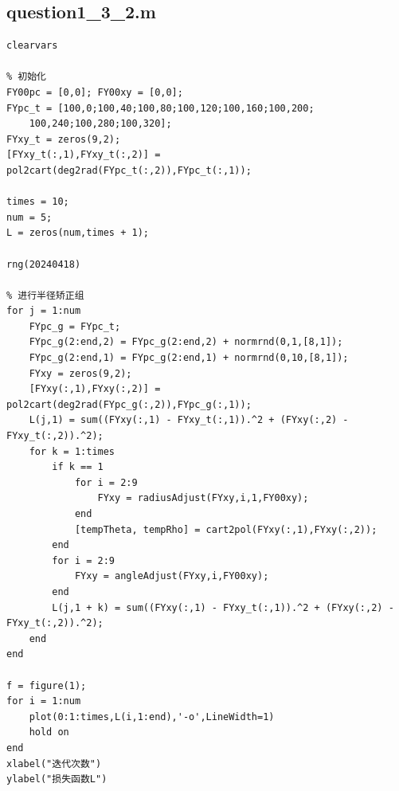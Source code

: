 \documentclass[12pt,AutoFakeSlant,AutoFakeBold]{article}
\begin{document}
\subsection{question1\_3\_2.m}
\begin{verbatim}
clearvars

% 初始化
FY00pc = [0,0]; FY00xy = [0,0];
FYpc_t = [100,0;100,40;100,80;100,120;100,160;100,200;
    100,240;100,280;100,320];
FYxy_t = zeros(9,2);
[FYxy_t(:,1),FYxy_t(:,2)] = pol2cart(deg2rad(FYpc_t(:,2)),FYpc_t(:,1));

times = 10;
num = 5;
L = zeros(num,times + 1);

rng(20240418)

% 进行半径矫正组
for j = 1:num
    FYpc_g = FYpc_t;
    FYpc_g(2:end,2) = FYpc_g(2:end,2) + normrnd(0,1,[8,1]);
    FYpc_g(2:end,1) = FYpc_g(2:end,1) + normrnd(0,10,[8,1]);
    FYxy = zeros(9,2);
    [FYxy(:,1),FYxy(:,2)] = pol2cart(deg2rad(FYpc_g(:,2)),FYpc_g(:,1));
    L(j,1) = sum((FYxy(:,1) - FYxy_t(:,1)).^2 + (FYxy(:,2) - FYxy_t(:,2)).^2);
    for k = 1:times
        if k == 1
            for i = 2:9
                FYxy = radiusAdjust(FYxy,i,1,FY00xy);
            end
            [tempTheta, tempRho] = cart2pol(FYxy(:,1),FYxy(:,2));
        end
        for i = 2:9
            FYxy = angleAdjust(FYxy,i,FY00xy);
        end
        L(j,1 + k) = sum((FYxy(:,1) - FYxy_t(:,1)).^2 + (FYxy(:,2) - FYxy_t(:,2)).^2);
    end
end

f = figure(1);
for i = 1:num
    plot(0:1:times,L(i,1:end),'-o',LineWidth=1)
    hold on
end
xlabel("迭代次数")
ylabel("损失函数L")
\end{verbatim}
\end{document}
